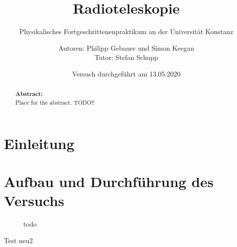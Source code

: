 

 
 \title{Radioteleskopie}
 \subtitle{Physikalisches Fortgeschrittenenpraktikum an der Universität Konstanz}
 \author{Autoren: Philipp Gebauer und Simon Keegan \\ \large{Tutor: Stefan Schupp}}
 \date{Versuch durchgeführt am 13.05.2020}
 \maketitle
 \vspace{2.5 cm}
 \begin{abstract}
     \noindent \textbf{Abstract:}\\
     Place for the abstract. TODO!!
     \vspace{1cm}
     
     \end{abstract}
 \thispagestyle{empty}
 \newpage
 
 \tableofcontents
 \thispagestyle{empty}
 \newpage
 \setcounter{page}{1}    
 
\section{Einleitung}
\section{Aufbau und Durchführung des Versuchs}
\begin{figure}[H]
    \centering
    
    \caption{todo}
    \label{fig:Sonnenabbild}
\end{figure}
Test neu2


